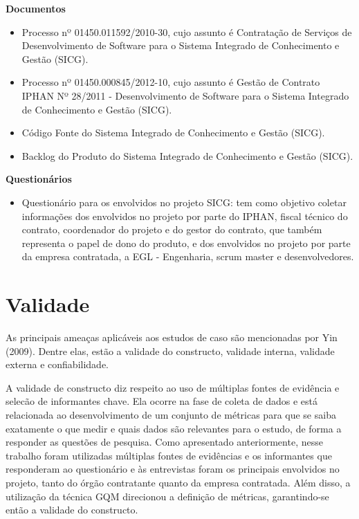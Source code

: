 \textbf{Documentos}
\begin{itemize}
\item Processo nº 01450.011592/2010-30, cujo assunto é Contratação de Serviços de Desenvolvimento de Software para o Sistema Integrado de Conhecimento e Gestão (SICG). 
\item Processo nº 01450.000845/2012-10, cujo assunto é Gestão de Contrato IPHAN Nº 28/2011 - Desenvolvimento de Software para o Sistema Integrado de Conhecimento e Gestão (SICG). 
\item Código Fonte do Sistema Integrado de Conhecimento e Gestão (SICG).
\item Backlog do Produto do Sistema Integrado de Conhecimento e Gestão (SICG).
\end{itemize}

\textbf{Questionários}
\begin{itemize}
\item Questionário para os envolvidos no projeto SICG: tem como objetivo coletar informações dos envolvidos no projeto por parte do IPHAN,  fiscal técnico do contrato, coordenador do projeto e do gestor do contrato, que também representa o papel de dono do produto, e dos envolvidos no projeto por parte da empresa contratada, a EGL - Engenharia, scrum master e desenvolvedores.
\end{itemize}

\section[Validade]{Validade}

As principais ameaças aplicáveis aos estudos de caso 
são mencionadas por Yin (2009). Dentre elas, estão a validade do constructo, validade interna, validade externa e confiabilidade.

A validade de constructo diz respeito ao uso de múltiplas fontes de evidência e selecão de informantes chave. Ela ocorre na fase de coleta de dados e está relacionada ao desenvolvimento de um conjunto de métricas para que se saiba exatamente o que medir e quais dados são relevantes para o estudo, de forma a responder as questões de pesquisa. Como apresentado anteriormente, nesse trabalho foram utilizadas múltiplas fontes de evidências e os informantes que responderam ao questionário e às entrevistas foram os principais envolvidos no projeto, tanto do órgão contratante quanto da empresa contratada. Além disso, a utilização da técnica GQM direcionou a definição de métricas, garantindo-se então a validade do constructo.

